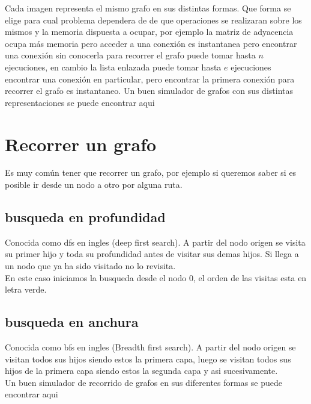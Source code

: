 Cada imagen representa el mismo grafo en sus distintas formas. Que forma se elige para cual problema dependera de de que operaciones se realizaran sobre los mismos y la memoria dispuesta a ocupar, por ejemplo la matriz de adyacencia ocupa más memoria pero acceder a una conexión es instantanea pero encontrar una conexión sin conocerla para recorrer el grafo puede tomar hasta $n$ ejecuciones, en cambio la lista enlazada puede tomar hasta $e$ ejecuciones encontrar una conexión en particular, pero encontrar la primera conexión para recorrer el grafo es instantaneo.
Un buen simulador de grafos con sus distintas representaciones se puede encontrar aqui \cite{graphStructure:Online}
\section{Recorrer un grafo}
Es muy común tener que recorrer un grafo, por ejemplo si queremos saber si es posible ir desde un nodo a otro por alguna ruta.
\subsection{busqueda en profundidad}
Conocida como dfs en ingles (deep first search). A partir del nodo origen se visita su primer hijo y toda su profundidad antes de visitar sus demas hijos. Si llega a un nodo que ya ha sido visitado no lo revisita.
\\
En este caso iniciamos la busqueda desde el nodo 0, el orden de las visitas esta en letra verde.
\subsection{busqueda en anchura}
Conocida como bfs en ingles (Breadth first search). A partir del nodo origen se visitan todos sus hijos siendo estos la primera capa, luego se visitan todos sus hijos de la primera capa siendo estos la segunda capa y asi sucesivamente.
\\
Un buen simulador de recorrido de grafos en sus diferentes formas se puede encontrar aqui \cite{graphTraversal:Online}
